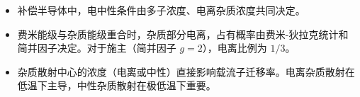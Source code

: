 \begin{insightbox}[物理图像]
\begin{itemize}
    \item 补偿半导体中，电中性条件由多子浓度、电离杂质浓度共同决定。
    \item 费米能级与杂质能级重合时，杂质部分电离，占有概率由费米-狄拉克统计和简并因子决定。对于施主（简并因子 $g=2$），电离比例为 $1/3$。
    \item 杂质散射中心的浓度（电离或中性）直接影响载流子迁移率。电离杂质散射在低温下主导，中性杂质散射在极低温下重要。
\end{itemize}
\end{insightbox}
